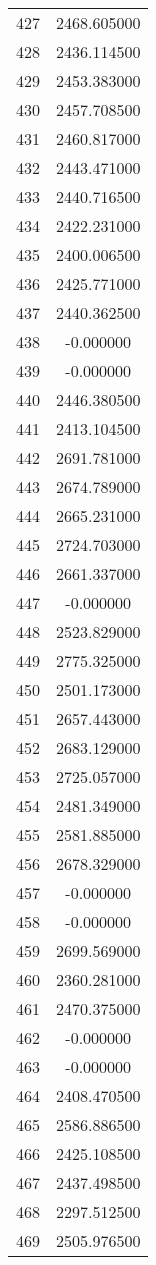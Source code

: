 \documentclass[12pt]{article}
\begin{document}
\begin{longtable}{@{}cc@{}}
427 & 2468.605000 \\
428 & 2436.114500 \\
429 & 2453.383000 \\
430 & 2457.708500 \\
431 & 2460.817000 \\
432 & 2443.471000 \\
433 & 2440.716500 \\
434 & 2422.231000 \\
435 & 2400.006500 \\
436 & 2425.771000 \\
437 & 2440.362500 \\
438 & -0.000000 \\
439 & -0.000000 \\
440 & 2446.380500 \\
441 & 2413.104500 \\
442 & 2691.781000 \\
443 & 2674.789000 \\
444 & 2665.231000 \\
445 & 2724.703000 \\
446 & 2661.337000 \\
447 & -0.000000 \\
448 & 2523.829000 \\
449 & 2775.325000 \\
450 & 2501.173000 \\
451 & 2657.443000 \\
452 & 2683.129000 \\
453 & 2725.057000 \\
454 & 2481.349000 \\
455 & 2581.885000 \\
456 & 2678.329000 \\
457 & -0.000000 \\
458 & -0.000000 \\
459 & 2699.569000 \\
460 & 2360.281000 \\
461 & 2470.375000 \\
462 & -0.000000 \\
463 & -0.000000 \\
464 & 2408.470500 \\
465 & 2586.886500 \\
466 & 2425.108500 \\
467 & 2437.498500 \\
468 & 2297.512500 \\
469 & 2505.976500 \\

\end{longtable}
\end{document}
